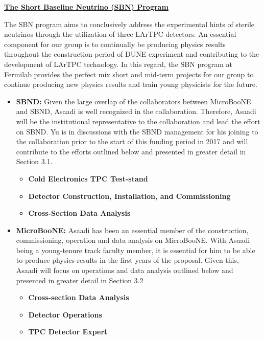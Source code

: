 \begin{center}
\underline{\textbf{The Short Baseline Neutrino (SBN) Program}}
\end{center}

\noindent The SBN program aims to conclusively address the experimental hints of sterile neutrinos through the utilization of three LArTPC detectors. An essential component for our group is to continually be producing physics results throughout the construction period of DUNE experiment and contributing to the development of LArTPC technology. In this regard, the SBN program at Fermilab provides the perfect mix short and mid-term projects for our group to continue producing new physics results and train young physicists for the future.

\begin{itemize}

\item {{\bf SBND:} Given the large overlap of the collaborators between MicroBooNE and SBND, Asaadi is well recognized in the collaboration.  Therefore, Asaadi will be the institutional representative to the collaboration and lead the effort on SBND.  Yu is in discussions with the SBND management for his joining to the collaboration prior to the start of this funding period in 2017 and will contribute to the efforts outlined below and presented in greater detail in Section 3.1. } 
\begin{itemize}
\item{\textbf{Cold Electronics TPC Test-stand}}

\item{\textbf{Detector Construction, Installation, and Commissioning}}

\item{\textbf{Cross-Section Data Analysis}}

\end{itemize}

\item{{\bf MicroBooNE:} Asaadi has been an essential member of the construction, commissioning, operation and data analysis on MicroBooNE. With Asaadi being a young-tenure track faculty member, it is essential for him to be able to produce physics results in the first years of the proposal. Given this, Asaadi will focus on operations and data analysis outlined below and presented in greater detail in Section 3.2}

\begin{itemize}
\item{\textbf{Cross-section Data Analysis}}
\item{\textbf{Detector Operations}}
\item{\textbf{TPC Detector Expert}}


\end{itemize}
\end{itemize}
